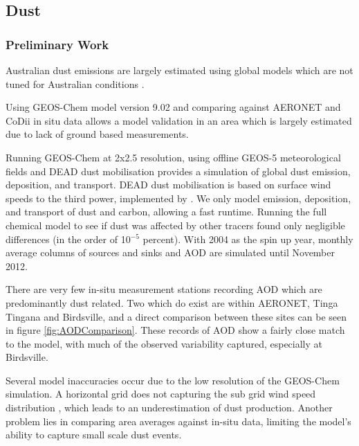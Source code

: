 \subsection{Dust}
\subsubsection{Preliminary Work}
Australian dust emissions are largely estimated using global models which are not tuned for Australian conditions \cite{Ridley_2013,Duncan_Fairlie_2007}.

Using GEOS-Chem model version 9.02 and comparing against AERONET and CoDii in situ data allows a model validation in an area which is largely estimated due to lack of ground based measurements.

Running GEOS-Chem at 2x2.5 resolution, using offline GEOS-5 meteorological fields and DEAD dust mobilisation provides a simulation of global dust emission, deposition, and transport.
DEAD dust mobilisation is based on surface wind speeds to the third power, implemented by \citet{Duncan_Fairlie_2007}.
We only model emission, deposition, and transport of dust and carbon, allowing a fast runtime.
Running the full chemical model to see if dust was affected by other tracers found only negligible differences (in the order of 10$^{-5}$ percent).
With 2004 as the spin up year, monthly average columns of sources and sinks and AOD are simulated until November 2012.

There are very few in-situ measurement stations recording AOD which are predominantly dust related.
Two which do exist are within AERONET, Tinga Tingana and Birdsville, and a direct comparison between these sites can be seen in figure \ref{fig:AODComparison}.
These records of AOD show a fairly close match to the model, with much of the observed variability captured, especially at Birdsville.

Several model inaccuracies occur due to the low resolution of the GEOS-Chem simulation.
A horizontal grid does not capturing the sub grid wind speed distribution \cite{Ridley_2013}, which leads to an underestimation of dust production.
Another problem lies in comparing area averages against in-situ data, limiting the model's ability to capture small scale dust events.

